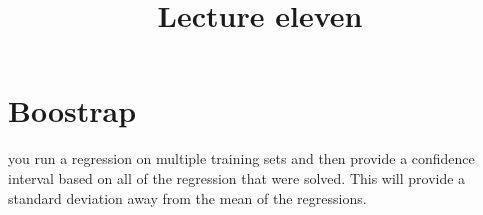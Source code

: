 \documentclass[letterpaper, 9pt]{article}
\title{Lecture eleven}
\begin{document}
\maketitle
\section{Boostrap}
you run a regression on multiple training sets and then provide a confidence interval based on all of the regression that were solved. This will provide a standard deviation away from the mean of the regressions.
\end{document}
